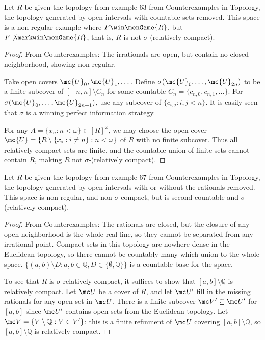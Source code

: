  \begin{ex}
  Let $R$ be given the topology from example 63 from Counterexamples in Topology, the topology generated by open intervals with countable sets removed. This space is a non-regular example where $F \win \menGame{R}$, but $F \not\markwin \menGame{R}$, that is, $R$ is not $\sigma$-(relatively compact).
  \end{ex}

  \begin{proof}
  From Counterexamples: The irrationals are open, but contain no closed neighborhood, showing non-regular.

  Take open covers $\mc{U}_0,\mc{U}_1,\dots$. Define $\sigma(\mc{U}_0,\dots,\mc{U}_{2n})$ to be a finite subcover of $[-n,n]\setminus C_n$ for some countable $C_n=\{c_{n,0}, c_{n,1}, \dots\}$. For $\sigma(\mc{U}_0,\dots,\mc{U}_{2n+1})$, use any subcover of $\{c_{i,j} : i,j < n\}$. It is easily seen that $\sigma$ is a winning perfect information strategy.

  For any $A=\{x_n:n<\omega\} \in [R]^\omega$, we may choose the open cover $\mc{U} = \{R \setminus \{x_i: i \not= n\} : n < \omega \}$ of $R$ with no finite subcover. Thus all relatively compact sets are finite, and the countable union of finite sets cannot contain $R$, making $R$ not $\sigma$-(relatively compact).
  \end{proof}

  \begin{ex}
  Let $R$ be given the topology from example 67 from Counterexamples in Topology, the topology generated by open intervals with or without the rationals removed. This space is non-regular, and non-$\sigma$-compact, but is second-countable and $\sigma$-(relatively compact).
  \end{ex}

  \begin{proof}
  From Counterexamples: The rationals are closed, but the closure of any open neighborhood is the whole real line, so they cannot be separated from any irrational point. Compact sets in this topology are nowhere dense in the Euclidean topology, so there cannot be countably many which union to the whole space. $\{(a,b)\setminus D : a,b\in\mathbb{Q},D\in\{\emptyset,\mathbb{Q}\}\}$ is a countable base for the space.

  To see that $R$ is $\sigma$-relatively compact, it suffices to show that $[a,b]\setminus\mathbb{Q}$ is relatively compact. Let $\mc U$ be a cover of $R$, and let $\mc U'$ fill in the missing rationals for any open set in $\mc U$. There is a finite subcover $\mc V'\subseteq \mc U'$ for $[a,b]$ since $\mc U'$ contains open sets from the Euclidean topology. Let $\mc V= \{V\setminus\mathbb{Q}:V\in V'\}$: this is a finite refinment of $\mc U$ covering $[a,b]\setminus\mathbb{Q}$, so $[a,b]\setminus\mathbb{Q}$ is relatively compact.
  \end{proof}

